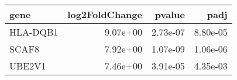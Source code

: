 \begin{tabular}{lrrr}
\toprule
    gene &  log2FoldChange &   pvalue &     padj \\
\midrule
HLA-DQB1 &        9.07e+00 & 2.73e-07 & 8.80e-05 \\
   SCAF8 &        7.92e+00 & 1.07e-09 & 1.06e-06 \\
  UBE2V1 &        7.46e+00 & 3.91e-05 & 4.35e-03 \\
\bottomrule
\end{tabular}
